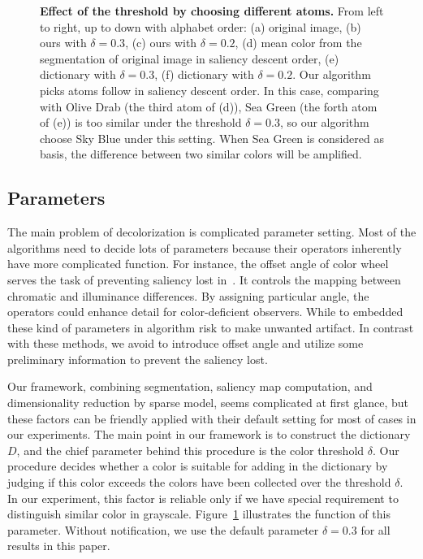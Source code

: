 \begin{figure}[t]
\begin{center}
\begin{tabular}{ccc}
\end{tabular}
\caption{
\textbf{Effect of the threshold by choosing different atoms.} 
From left to right, up to down with alphabet order:
(a) original image,
(b) ours with $\delta=0.3$,
(c) ours with $\delta=0.2$,
(d) mean color from the segmentation of original image in saliency descent order,
(e) dictionary with $\delta=0.3$,
(f) dictionary with $\delta=0.2$.
Our algorithm picks atoms follow in saliency descent order. In this case, comparing with
Olive Drab (the third atom of (d)), Sea Green (the forth atom of (e)) is too similar 
under the threshold $\delta=0.3$,
so our algorithm choose Sky Blue under this setting.
When Sea Green is considered as basis, the difference between two similar colors
will be amplified.}
\label{fig:parameters}
\end{center}
\end{figure}

\subsection{Parameters}
\label{sec:parameters}
The main problem of decolorization is complicated parameter setting.
Most of the algorithms need to decide lots of parameters because 
their operators inherently have more complicated function.
For instance, the offset angle of color wheel serves the task of preventing
saliency lost in~\cite{Gooch:2005:CSC,Ancuti:2011:ESG}.
It controls the mapping between chromatic and illuminance differences.
By assigning particular angle, the operators could enhance detail for
color-deficient observers.
While to embedded these kind of parameters in algorithm risk to make unwanted artifact.
In contrast with these methods, we avoid to introduce offset angle and 
utilize some preliminary information to prevent the saliency lost.

Our framework, combining segmentation, saliency map computation, and dimensionality
reduction by sparse model, seems complicated at first glance,
but these factors can be friendly applied with their default setting for most of cases
in our experiments.
The main point in our framework is to construct the dictionary $D$,
and the chief parameter behind this procedure is the color threshold $\delta$.
Our procedure decides whether a color is suitable for adding in the dictionary by
judging if this color exceeds the colors have been collected over the threshold $\delta$.
In our experiment, this factor is reliable only if we have special requirement
to distinguish similar color in grayscale.
Figure~\ref{fig:parameters} illustrates the function of this parameter.
Without notification, we use the default parameter $\delta=0.3$ for all results in
this paper.

